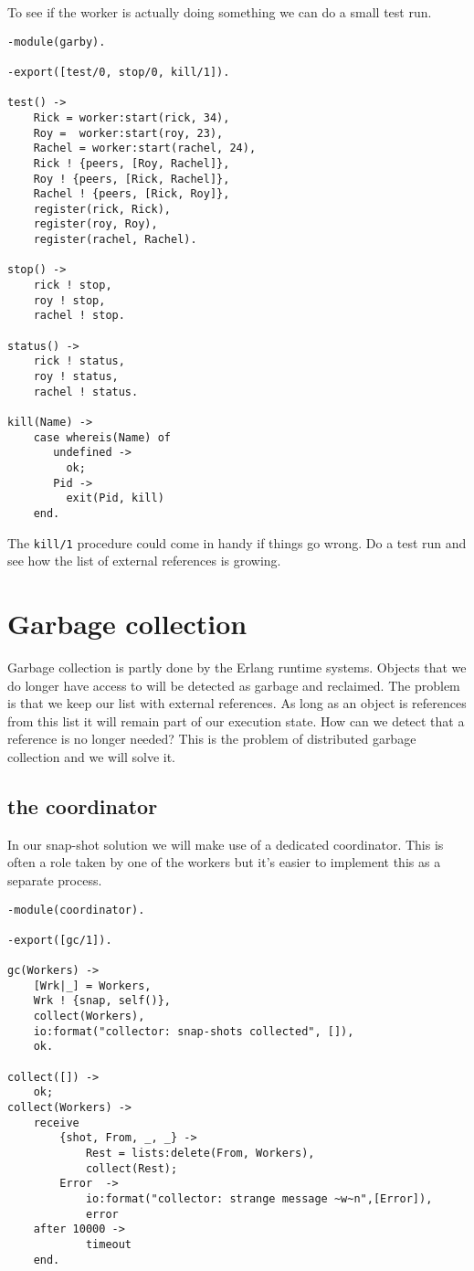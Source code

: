 \documentclass[a4paper,11pt]{article}
\begin{document}
To see if the worker is actually doing something we can do a small
test run.

\begin{verbatim}
-module(garby).

-export([test/0, stop/0, kill/1]).

test() ->
    Rick = worker:start(rick, 34),
    Roy =  worker:start(roy, 23),
    Rachel = worker:start(rachel, 24),
    Rick ! {peers, [Roy, Rachel]},
    Roy ! {peers, [Rick, Rachel]},
    Rachel ! {peers, [Rick, Roy]},
    register(rick, Rick),
    register(roy, Roy),
    register(rachel, Rachel).
    
stop() ->
    rick ! stop,
    roy ! stop,
    rachel ! stop.

status() ->
    rick ! status,
    roy ! status,
    rachel ! status.

kill(Name) ->
    case whereis(Name) of 
       undefined -> 
         ok; 
       Pid -> 
         exit(Pid, kill) 
    end.
\end{verbatim}

The {\tt kill/1} procedure could come in handy if things go wrong. Do
a test run and see how the list of external references is growing.

\section{Garbage collection}

Garbage collection is partly done by the Erlang runtime
systems. Objects that we do longer have access to will be detected as
garbage and reclaimed. The problem is that we keep our list with
external references. As long as an object is references from this list
it will remain part of our execution state. How can we detect that a
reference is no longer needed? This is the problem of distributed
garbage collection and we will solve it.


\subsection{the coordinator}

In our snap-shot solution we will make use of a dedicated
coordinator. This is often a role taken by one of the workers but it's
easier to implement this as a separate process.

\begin{verbatim}
-module(coordinator).

-export([gc/1]).

gc(Workers) ->
    [Wrk|_] = Workers,
    Wrk ! {snap, self()},
    collect(Workers),
    io:format("collector: snap-shots collected", []),
    ok.

collect([]) ->
    ok;
collect(Workers) ->
    receive 
        {shot, From, _, _} ->
            Rest = lists:delete(From, Workers),
            collect(Rest);
        Error  ->
            io:format("collector: strange message ~w~n",[Error]),
            error
    after 10000 ->
            timeout
    end.
\end{verbatim}
\end{document}
